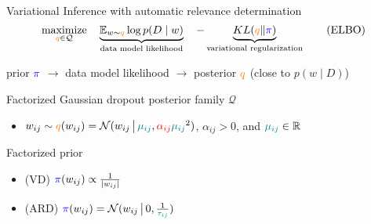 \documentclass[handout]{beamer}
\newcommand{\real}{\mathbb{R}}
\begin{document}
\begin{frame}[c]{\insertsubsection}{}
  Variational Inference with automatic relevance
  determination\textsuperscript{\citep{molchanov_variational_2017}}
  \begin{equation}
    \label{eq:elbo}
    \underset{
      {\color{orange} q} \in \mathcal{Q}
    }{\text{maximize}}
    \quad
    \underbrace{
      \mathbb{E}_{w \sim {\color{orange} q}}
          \log p(D \mid w)  %
    }_{
      \text{data model likelihood}
    }
    \quad
    - \underbrace{
      \mathop{KL}({\color{orange} q}\|{\color{blue} \pi})
    }_{
      \text{variational regularization}
    }
    \tag{ELBO}
  \end{equation}

  \medskip
  prior ${\color{blue} \pi}$
    $\to$ data model likelihood
    $\to$ posterior ${\color{orange} q}$
    (close to $p(w \mid D)$)

  \bigskip

  \pause
  \bigskip
  Factorized Gaussian dropout posterior family $\mathcal{Q}$
  \begin{itemize}
    \item $
      w_{ij} \sim {\color{orange} q}(w_{ij})
        = \mathcal{N}(
          w_{ij}\,\big\vert\,
          {\color{teal} \mu_{ij}},
          {\color{red} \alpha_{ij}}
            {\color{teal} \mu_{ij}}^2
        )
    $, $\alpha_{ij} > 0$, and ${\color{teal} \mu_{ij}} \in \real$
  \end{itemize}

  \medskip
  Factorized prior
  \begin{itemize}
    \item (VD\textsuperscript{\citep{molchanov_variational_2017}}) $
      {\color{blue} \pi}(w_{ij})
        \propto \frac1{\lvert w_{ij}\rvert}
    $
    \item (ARD\textsuperscript{\citep{kharitonov_variational_2018}}) $
      {\color{blue} \pi}(w_{ij}) = \mathcal{N}(
        w_{ij}\,\big\vert\,
        0, \tfrac1{{\color{teal} \tau_{ij}}}
      )
    $
  \end{itemize}

\end{frame}
\end{document}
